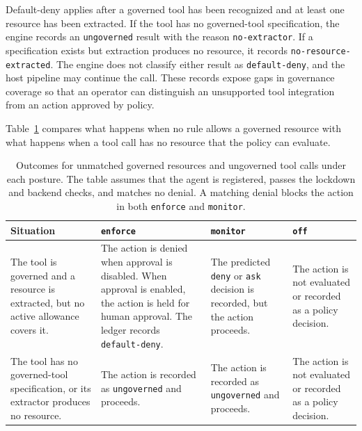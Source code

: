 Default-deny applies after a governed tool has been recognized and at least
one resource has been extracted. If the tool has no governed-tool
specification, the engine records an \texttt{ungoverned} result with the
reason \texttt{no-extractor}. If a specification exists but extraction
produces no resource, it records
\texttt{no-resource-extracted}. The engine does not classify either result as
\texttt{default-deny}, and the host pipeline may continue the call. These
records expose gaps in governance coverage so that an operator can distinguish
an unsupported tool integration from an action approved by policy.

Table~\ref{tab:gov-unmatched-outcomes} compares what happens when no rule allows a governed resource with what happens when a tool call has no resource that the policy can evaluate.

\begin{table}[htbp]
\centering
\small
\renewcommand{\arraystretch}{1.35}
\begin{tabular}{@{}
  >{\raggedright\arraybackslash}p{3.2cm}
  >{\raggedright\arraybackslash}p{4.1cm}
  >{\raggedright\arraybackslash}p{3.5cm}
  >{\raggedright\arraybackslash}p{2.8cm}
@{}}
\toprule
\textbf{Situation} &
\textbf{\texttt{enforce}} &
\textbf{\texttt{monitor}} &
\textbf{\texttt{off}} \\
\midrule

The tool is governed and a resource is extracted, but no active allowance
covers it. &
The action is denied when approval is disabled. When approval is enabled, the
action is held for human approval. The ledger records
\texttt{default-deny}. &
The predicted \texttt{deny} or \texttt{ask} decision is recorded, but the
action proceeds. &
The action is not evaluated or recorded as a policy decision. \\

The tool has no governed-tool specification, or its extractor produces no
resource. &
The action is recorded as \texttt{ungoverned} and proceeds. &
The action is recorded as \texttt{ungoverned} and proceeds. &
The action is not evaluated or recorded as a policy decision. \\

\bottomrule
\end{tabular}
\caption[Outcomes for unmatched and ungoverned calls]
{\footnotesize Outcomes for unmatched governed resources and ungoverned tool
calls under each posture. The table assumes that the agent is registered,
passes the lockdown and backend checks, and matches no denial. A
matching denial blocks the action in both \texttt{enforce} and
\texttt{monitor}.}
\label{tab:gov-unmatched-outcomes}
\end{table}

